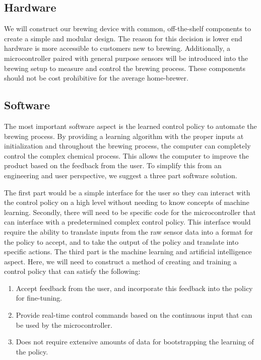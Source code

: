 \subsection{Hardware}
We will construct our brewing device with common, off-the-shelf components
to create a simple and modular design. The reason for this decision is 
lower end hardware is more accessible to customers new to brewing.
Additionally, a microcontroller paired with general purpose sensors will be 
introduced into the brewing setup to measure and control the brewing process.
These components should not be cost prohibitive for the average home-brewer.

\subsection{Software}
The most important software aspect is the learned control policy 
to automate the brewing process. By providing a learning algorithm with the proper 
inputs at initialization and throughout the brewing process, the computer can completely 
control the complex chemical process. This allows the computer to improve the product 
based on the feedback from the user. To simplify this from an engineering and user 
perspective, we suggest a three part software solution.

The first part would be a simple interface for the user so they can 
interact with the control policy on a high level without needing to know concepts of 
machine learning. Secondly, there will need to be specific code for the microcontroller 
that can interface with a predetermined complex control policy. This interface would 
require the ability to translate inputs from the raw sensor data into a format for 
the policy to accept, and to take the  output of the policy and translate into specific 
actions. The third part is the machine learning and artificial intelligence aspect.
Here, we will need to construct a method of creating and training a control policy 
that can satisfy the following:

\begin{enumerate}
	\item Accept feedback from the user, and incorporate this feedback into the 
		policy for fine-tuning.
	\item Provide real-time control commands based on the continuous input that 
		can be used by the microcontroller.
	\item Does not require extensive amounts of data for bootstrapping the learning 
		of the policy.
\end{enumerate}

